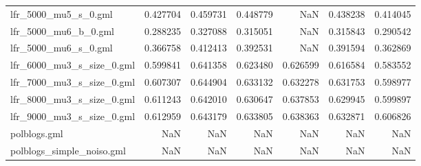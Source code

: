 \begin{tabular}{lrrrrrr}
lfr\_5000\_mu5\_s\_0.gml       &                            0.427704 &                       0.459731 &                          0.448779 &                           NaN &                        0.438238 &                                0.414045 \\
lfr\_5000\_mu6\_b\_0.gml       &                            0.288235 &                       0.327088 &                          0.315051 &                           NaN &                        0.315843 &                                0.290542 \\
lfr\_5000\_mu6\_s\_0.gml       &                            0.366758 &                       0.412413 &                          0.392531 &                           NaN &                        0.391594 &                                0.362869 \\
lfr\_6000\_mu3\_s\_size\_0.gml  &                            0.599841 &                       0.641358 &                          0.623480 &                      0.626599 &                        0.616584 &                                0.583552 \\
lfr\_7000\_mu3\_s\_size\_0.gml  &                            0.607307 &                       0.644904 &                          0.633132 &                      0.632278 &                        0.631753 &                                0.598977 \\
lfr\_8000\_mu3\_s\_size\_0.gml  &                            0.611243 &                       0.642010 &                          0.630647 &                      0.637853 &                        0.629945 &                                0.599897 \\
lfr\_9000\_mu3\_s\_size\_0.gml  &                            0.612959 &                       0.643179 &                          0.633805 &                      0.638363 &                        0.632871 &                                0.606826 \\
polblogs.gml               &                                 NaN &                            NaN &                               NaN &                           NaN &                             NaN &                                     NaN \\
polblogs\_simple\_noiso.gml  &                                 NaN &                            NaN &                               NaN &                           NaN &                             NaN &                                     NaN \\
\bottomrule
\end{tabular}
